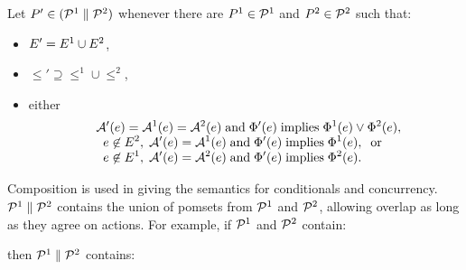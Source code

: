 \begin{definition}
Let $P' \in (\mathcal{P}^1 \parallel \mathcal{P}^2)$
whenever there are $P^1 \in \mathcal{P}^1$ and $P^2 \in \mathcal{P}^2$ such that:
\begin{itemize}
\item $E' = E^1 \cup E^2$,
\item ${\le'}\supseteq{\le^1}\cup{\le^2}$, %
\item either
  \begin{align*}
    \;\;&\mathcal{A}'(e) = \mathcal{A}^1(e) = \mathcal{A}^2(e) \;\allowbreak\text{and}\allowbreak\; \Phi'(e) \; \allowbreak\text{implies}\allowbreak\; \Phi^1(e) \lor \Phi^2(e),\\[-1ex]
    &\;\;e \not\in E^2,\; \mathcal{A}'(e) = \mathcal{A}^1(e) \;\allowbreak\text{and}\allowbreak\; \Phi'(e) \; \allowbreak\text{implies}\allowbreak\; \Phi^1(e),\; \; \allowbreak\text{or}\allowbreak\;\\[-1ex]
    &\;\;e \not\in E^1,\; \mathcal{A}'(e) = \mathcal{A}^2(e) \;\allowbreak\text{and}\allowbreak\; \Phi'(e) \; \allowbreak\text{implies}\allowbreak\; \Phi^2(e).
  \end{align*}
\end{itemize}
\end{definition}
Composition is used in giving the semantics for conditionals and concurrency.
$\mathcal{P}^1 \parallel \mathcal{P}^2$ contains the union of pomsets from $\mathcal{P}^1$ and
$\mathcal{P}^2$, allowing overlap as long as they agree on actions. For example, if
$\mathcal{P}^1$ and $\mathcal{P}^2$ contain:
\begin{tikzdisplay}[node distance=1em]
\end{tikzdisplay}
then $\mathcal{P}^1 \parallel \mathcal{P}^2$ contains:
\begin{tikzdisplay}[node distance=1em]
\end{tikzdisplay}

